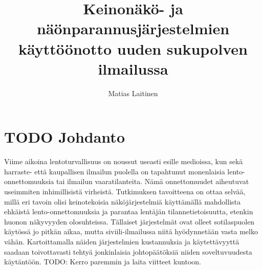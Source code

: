 \documentclass[utf8,bachelor,manualbib]{gradu3}
\begin{document}
\title{Keinonäkö- ja näönparannusjärjestelmien käyttöönotto uuden sukupolven ilmailussa}



\author{Matias Laitinen}

\maketitle
  
\mainmatter

\chapter{TODO Johdanto}

Viime aikoina lentoturvallisuus on noussut useasti esille medioissa, kun sekä harraste- että kaupallisen ilmailun puolella on tapahtunut monenlaisia lento-onnettomuuksia tai ilmailun vaaratilanteita. Nämä onnettomuudet aiheutuvat useimmiten inhimillisistä virheistä. Tutkimuksen tavoitteena on ottaa selvää, millä eri tavoin olisi keinotekoisia näköjärjestelmiä käyttämällä mahdollista ehkäistä lento-onnettomuuksia ja parantaa lentäjän tilannetietoisuutta, etenkin huonon näkyvyyden olosuhteissa. Tällaiset järjestelmät ovat olleet sotilaspuolen käytössä jo pitkän aikaa, mutta siviili-ilmailussa niitä hyödynnetään vasta melko vähän. Kartoittamalla näiden järjestelmien kustannuksia ja käytettävyyttä saadaan toivottavasti tehtyä jonkinlaisia johtopäätöksiä niiden soveltuvuudesta käytäntöön. TODO: Kerro paremmin ja laita viitteet kuntoon.
\end{document}
